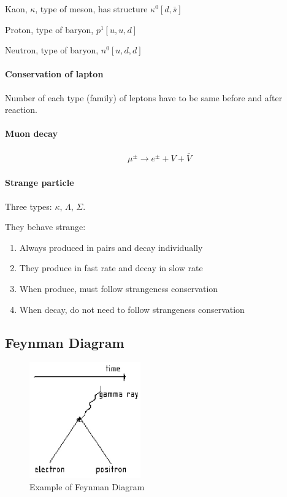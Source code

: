             Kaon, $\kappa$, type of meson, has structure $\kappa^0 [d, \bar{s}]$

            Proton, type of baryon, $p^1[u, u, d]$

            Neutron, type of baryon, $n^0[u, d, d]$
        
        \paragraph{Conservation of lapton}
            Number of each type (family) of leptons have to be same before and after reaction.
        
        \paragraph{Muon decay}
            \begin{align}
                \mu^{\pm} \to e^{\pm} + V + \bar{V}
            \end{align}

        \paragraph{Strange particle}
            Three types: $\kappa$, $\Lambda$, $\Sigma$.

            They behave strange:
            \begin{enumerate}
                \item Always produced in pairs and decay individually
                \item They produce in fast rate and decay in slow rate
                \item When produce, must follow strangeness conservation
                \item When decay, do not need to follow strangeness conservation
            \end{enumerate}

    \subsection{Feynman Diagram}
        \begin{figure}[H]
            \begin{center}
                \includegraphics[height=5cm]{nuclear_charts/fym_dia.eps}
            \end{center}
            \caption{Example of Feynman Diagram}
            \label{fey_dia}
        \end{figure}


